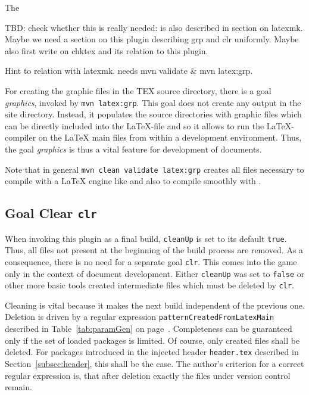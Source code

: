 The 

TBD\@: check whether this is really needed: is also described in section on latexmk. 
Maybe we need a section on this plugin describing grp and clr uniformly. 
Maybe also first write on chktex and its relation to this plugin. 

Hint to relation with latexmk. 
needs mvn validate \& mvn latex:grp. 

For creating the graphic files in the TEX source directory, 
there is a goal \emph{graphics}, invoked by \texttt{mvn latex:grp}. 
This goal does not create any output in the site directory. 
Instead, it populates the source directories 
with graphic files which can be directly included into the \LaTeX-file 
and so it allows to run the \LaTeX-compiler on the \LaTeX{} main files 
from within a development environment. 
Thus, the goal \emph{graphics} is thus a vital feature 
for development of documents. 


Note that in general \texttt{mvn clean validate latex:grp} 
creates all files necessary to compile with a \LaTeX{} engine like \lualatex{} 
and also to compile smoothly with . 



\subsection{Goal Clear \texttt{clr}}\label{subsec:develClear}

When invoking this plugin as a final build, 
\texttt{cleanUp} is set to its default \texttt{true}. 
Thus, all files not present at the beginning of the build process are removed. 
As a consequence, there is no need for a separate goal \texttt{clr}. 
This comes into the game only in the context of document development. 
Either \texttt{cleanUp} was set to \texttt{false} 
or other more basic tools created intermediate files which must be deleted by \texttt{clr}. 

Cleaning is vital because it makes the next build independent of the previous one. 
Deletion is driven by a regular expression \texttt{patternCreatedFromLatexMain} 
described in Table~\ref{tab:paramGen} on page~\pageref{tab:paramGen}. 
Completeness can be guaranteed only 
if the set of loaded packages is limited. 
Of course, only created files shall be deleted. 
For packages introduced in the injected header \texttt{header.tex} 
described in Section~\ref{subsec:header}, this shall be the case. 
The author's criterion for a correct regular expression is, 
that after deletion exactly the files under version control remain. 


